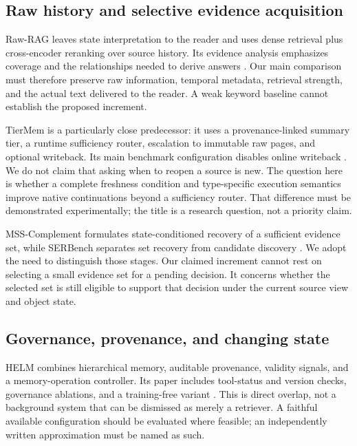 \subsection{Raw history and selective evidence
acquisition}\label{raw-history-and-selective-evidence-acquisition}

Raw-RAG leaves state interpretation to the reader and uses dense
retrieval plus cross-encoder reranking over source history. Its evidence
analysis emphasizes coverage and the relationships needed to derive
answers \citep{bao2026rawrag}. Our main comparison must therefore
preserve raw information, temporal metadata, retrieval strength, and the
actual text delivered to the reader. A weak keyword baseline cannot
establish the proposed increment.

TierMem is a particularly close predecessor: it uses a provenance-linked
summary tier, a runtime sufficiency router, escalation to immutable raw
pages, and optional writeback. Its main benchmark configuration disables
online writeback \citep{zhu2026tiermem}. We do not claim that asking
when to reopen a source is new. The question here is whether a complete
freshness condition and type-specific execution semantics improve native
continuations beyond a sufficiency router. That difference must be
demonstrated experimentally; the title is a research question, not a
priority claim.

MSS-Complement formulates state-conditioned recovery of a sufficient
evidence set, while SERBench separates set recovery from candidate
discovery \citep{feng2026missingcomplement}. We adopt the need to
distinguish those stages. Our claimed increment cannot rest on selecting
a small evidence set for a pending decision. It concerns whether the
selected set is still eligible to support that decision under the
current source view and object state.

\subsection{Governance, provenance, and changing
state}\label{governance-provenance-and-changing-state}

HELM combines hierarchical memory, auditable provenance, validity
signals, and a memory-operation controller. Its paper includes
tool-status and version checks, governance ablations, and a
training-free variant \citep{liu2026helm}. This is direct overlap, not a
background system that can be dismissed as merely a retriever. A
faithful available configuration should be evaluated where feasible; an
independently written approximation must be named as such.

